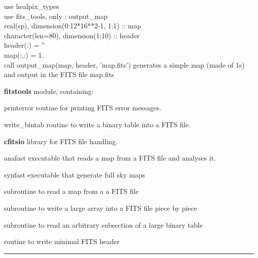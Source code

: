 \begin{example}
{
use healpix\_types \\
use fits\_tools, only : output\_map \\
real(sp), dimension(0:12*16**2-1, 1:1) :: map \\
character(len=80), dimension(1:10) :: header \\
header(:) = '' \\
map(:,:) = 1. \\
call output\_map(map, header, 'map.fits')
}
{generates a simple map (made of 1s) and output in the FITS file map.fits
}
\end{example}
\newpage
\begin{modules}
  \begin{sulist}{} %
  \item[\textbf{fitstools}] module, containing:
  \item[printerror] routine for printing FITS error messages.
  \item[write\_bintab] routine to write a binary table into a FITS file.
  \item[\textbf{cfitsio}] library for FITS file handling.		
  \end{sulist}
\end{modules}

\begin{related}
  \begin{sulist}{} %
  \item[anafast] executable that reads a \healpix map from a FITS file
  and analyses it. 
  \item[synfast] executable that generate full sky \healpix maps
  \item[\htmlref{input\_map}{sub:input_map}] subroutine to read a \healpix map from a a FITS file
  \item[\htmlref{write\_bintabh}{sub:write_bintabh}] subroutine to write a large
  array into a FITS file piece by piece
  \item[\htmlref{input\_tod*}{sub:input_tod}] subroutine to read an arbitrary subsection of
  a large binary table
  \item[\htmlref{write\_minimal\_header}{sub:write_minimal_header}] routine to
write minimal FITS header
  \end{sulist}
\end{related}

\rule{\hsize}{2mm}

\newpage
